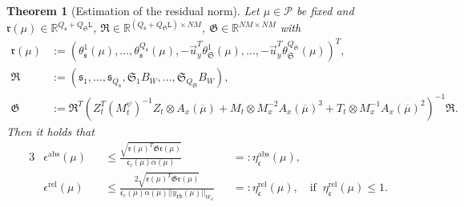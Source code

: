 \documentclass{article}
\theoremstyle{plain}
\newtheorem{theorem}{Theorem}[section]
\theoremstyle{definition}
\theoremstyle{remark}
\newcommand{\RR}{\mathbb{R}}
\newcommand{\RBestCcABS}{\eta_\mathfrak{c}^\text{abs}}
\newcommand{\RBestCcREL}{\eta_\mathfrak{c}^\text{rel}}
\begin{document}
\begin{theorem}[Estimation of the residual norm]\label{thm:RB_error_est_cc_sq} 
Let $\mu \in \mathcal{P}$ be fixed and $\mathfrak{r}(\mu) \in \RR^{Q_{\mathfrak{s}}+Q_{\mathfrak{S}}\texttt{L}}$, $\mathfrak{R} \in \RR^{(Q_{\mathfrak{s}}+Q_{\mathfrak{S}}\texttt{L}) \times NM}$, $\mathfrak{G} \in \RR^{NM\times NM}$ with
\begin{align}\label{eq:residualRBparameterpart}
    \mathfrak{r}(\mu) &:= \left(\theta_{\mathfrak{s}}^{1}(\mu), ..., \theta_{\mathfrak{s}}^{Q_{\mathfrak{s}}}(\mu), -\Vec{u}_{y}^T\theta_{\mathfrak{S}}^{1}(\mu), ..., -\Vec{u}_{y}^T\theta_{\mathfrak{S}}^{Q_{\mathfrak{S}}}(\mu)\right)^T , \\
    \mathfrak{R} &:= \left(\mathfrak{s}_{1}, ...,  \mathfrak{s}_{Q_{\mathfrak{s}}}, \mathfrak{S}_{1}B_W, ..., \mathfrak{S}_{Q_{\mathfrak{S}}}B_W\right) , \\
    \mathfrak{G} &:= \mathfrak{R}^T\left(Z_t^T (M_t^\psi)^{-1} Z_t \otimes A_{x}(\overline{\mu}) + M_{t} \otimes M_{x}^{-2} A_{x}(\overline{\mu})^3 + T_t \otimes M_x^{-1}A_x(\overline{\mu})^2\right)^{-1}\mathfrak{R} .\label{eq:residualRBotherpart}
\end{align} 
Then it holds that
\begin{alignat}{3}\label{eq:rbabsestnew}
    &\epsilon^\text{abs}(\mu) &&\leq \frac{\sqrt{\mathfrak{r}(\mu)^T \mathfrak{G} \mathfrak{r}(\mu)}}{\mathfrak{c}_c(\mu) \alpha(\mu)} &&=: \RBestCcABS(\mu) , \\
    &\epsilon^\text{rel}(\mu) &&\leq \frac{2 \sqrt{\mathfrak{r}(\mu)^T \mathfrak{G} \mathfrak{r}(\mu)}}{\mathfrak{c}_c(\mu) \alpha(\mu)\vert \vert y_{\texttt{rb}}(\mu) \vert \vert _{W_d}} &&=: \RBestCcREL(\mu), \quad \text{if} \; \; \RBestCcREL(\mu) \leq 1 .
\end{alignat}
\end{theorem}
\end{document}
